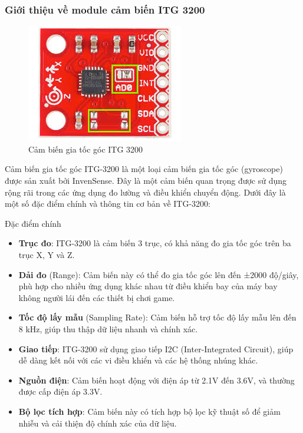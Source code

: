 \subsubsection{Giới thiệu về module cảm biến ITG 3200}
\begin{figure}[H]
    \centering
    \includegraphics[width=\textwidth,height=\textheight,keepaspectratio]{Images/Theoretical basis/ITG3200.jpg}
    \caption{Cảm biến gia tốc góc ITG 3200}
    \label{fig:capacitive_sensor}
\end{figure}
Cảm biến gia tốc góc ITG-3200 là một loại cảm biến gia tốc góc (gyroscope) được sản xuất bởi InvenSense. Đây là một cảm biến quan trọng được sử dụng rộng rãi trong các ứng dụng đo lường và điều khiển chuyển động. Dưới đây là một số đặc điểm chính và thông tin cơ bản về ITG-3200:

Đặc điểm chính
\begin{itemize}
\item \textbf{Trục đo}: ITG-3200 là cảm biến 3 trục, có khả năng đo gia tốc góc trên ba trục X, Y và Z.
\item \textbf{Dải đo} (Range): Cảm biến này có thể đo gia tốc góc lên đến ±2000 độ/giây, phù hợp cho nhiều ứng dụng khác nhau từ điều khiển bay của máy bay không người lái đến các thiết bị chơi game.
 \item \textbf{Tốc độ lấy mẫu} (Sampling Rate): Cảm biến hỗ trợ tốc độ lấy mẫu lên đến 8 kHz, giúp thu thập dữ liệu nhanh và chính xác.
 \item \textbf{Giao tiếp}: ITG-3200 sử dụng giao tiếp I2C (Inter-Integrated Circuit), giúp dễ dàng kết nối với các vi điều khiển và các hệ thống nhúng khác.
\item \textbf{Nguồn điện}: Cảm biến hoạt động với điện áp từ 2.1V đến 3.6V, và thường được cấp điện áp 3.3V.
\item \textbf{Bộ lọc tích hợp}: Cảm biến này có tích hợp bộ lọc kỹ thuật số để giảm nhiễu và cải thiện độ chính xác của dữ liệu.
\end{itemize}
